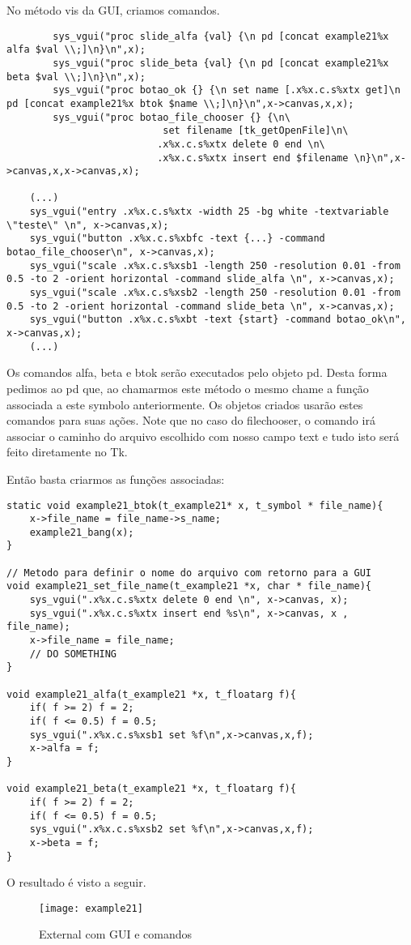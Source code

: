 No método vis da GUI, criamos comandos.

\begin{lstlisting}
	    sys_vgui("proc slide_alfa {val} {\n pd [concat example21%x alfa $val \\;]\n}\n",x);
	    sys_vgui("proc slide_beta {val} {\n pd [concat example21%x beta $val \\;]\n}\n",x);
	    sys_vgui("proc botao_ok {} {\n set name [.x%x.c.s%xtx get]\n pd [concat example21%x btok $name \\;]\n}\n",x->canvas,x,x);
	    sys_vgui("proc botao_file_chooser {} {\n\
						   set filename [tk_getOpenFile]\n\
						  .x%x.c.s%xtx delete 0 end \n\
						  .x%x.c.s%xtx insert end $filename \n}\n",x->canvas,x,x->canvas,x);

	(...)
	sys_vgui("entry .x%x.c.s%xtx -width 25 -bg white -textvariable \"teste\" \n", x->canvas,x);
	sys_vgui("button .x%x.c.s%xbfc -text {...} -command botao_file_chooser\n", x->canvas,x);
	sys_vgui("scale .x%x.c.s%xsb1 -length 250 -resolution 0.01 -from 0.5 -to 2 -orient horizontal -command slide_alfa \n", x->canvas,x);
	sys_vgui("scale .x%x.c.s%xsb2 -length 250 -resolution 0.01 -from 0.5 -to 2 -orient horizontal -command slide_beta \n", x->canvas,x);
	sys_vgui("button .x%x.c.s%xbt -text {start} -command botao_ok\n", x->canvas,x);
	(...)
\end{lstlisting}

Os comandos alfa, beta e btok serão executados pelo objeto pd. Desta forma pedimos ao pd que, ao chamarmos este método o mesmo chame
a função associada a este symbolo anteriormente. Os objetos criados usarão estes comandos para suas ações.
Note que no caso do filechooser, o comando irá associar o caminho do arquivo escolhido com nosso campo text e tudo isto será feito
diretamente no Tk.

Então basta criarmos as funções associadas:

\begin{lstlisting}
static void example21_btok(t_example21* x, t_symbol * file_name){
    x->file_name = file_name->s_name;
    example21_bang(x); 
}

// Metodo para definir o nome do arquivo com retorno para a GUI
void example21_set_file_name(t_example21 *x, char * file_name){
    sys_vgui(".x%x.c.s%xtx delete 0 end \n", x->canvas, x);
    sys_vgui(".x%x.c.s%xtx insert end %s\n", x->canvas, x , file_name);
    x->file_name = file_name;
    // DO SOMETHING
}

void example21_alfa(t_example21 *x, t_floatarg f){
    if( f >= 2) f = 2;
    if( f <= 0.5) f = 0.5; 
    sys_vgui(".x%x.c.s%xsb1 set %f\n",x->canvas,x,f);
    x->alfa = f;
}

void example21_beta(t_example21 *x, t_floatarg f){
    if( f >= 2) f = 2;
    if( f <= 0.5) f = 0.5; 
    sys_vgui(".x%x.c.s%xsb2 set %f\n",x->canvas,x,f);
    x->beta = f;
}
\end{lstlisting}

O resultado é visto a seguir.

\begin{figure}[h!]
	\centering
	\texttt{[image: example21]}
	\caption{External com GUI e comandos}
\end{figure}


